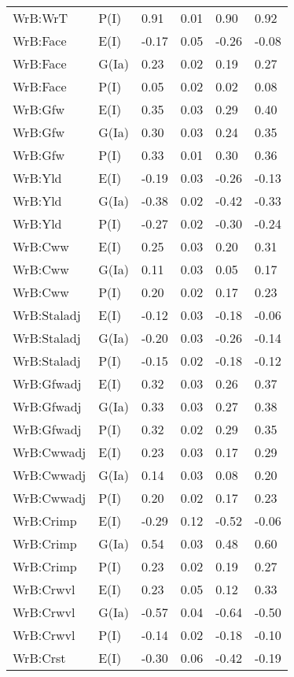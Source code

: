 \begin{center}
\begin{longtable}{|p{1.1in}|p{0.7in}|p{0.7in}|p{0.6in}|p{0.6in}|p{0.6in}|}
  WrB:WrT & P(I) & 0.91 & 0.01 & 0.90 & 0.92 \\ 
  WrB:Face & E(I) & -0.17 & 0.05 & -0.26 & -0.08 \\ 
  WrB:Face & G(Ia) & 0.23 & 0.02 & 0.19 & 0.27 \\ 
  WrB:Face & P(I) & 0.05 & 0.02 & 0.02 & 0.08 \\ 
  WrB:Gfw & E(I) & 0.35 & 0.03 & 0.29 & 0.40 \\ 
  WrB:Gfw & G(Ia) & 0.30 & 0.03 & 0.24 & 0.35 \\ 
  WrB:Gfw & P(I) & 0.33 & 0.01 & 0.30 & 0.36 \\ 
  WrB:Yld & E(I) & -0.19 & 0.03 & -0.26 & -0.13 \\ 
  WrB:Yld & G(Ia) & -0.38 & 0.02 & -0.42 & -0.33 \\ 
  WrB:Yld & P(I) & -0.27 & 0.02 & -0.30 & -0.24 \\ 
  WrB:Cww & E(I) & 0.25 & 0.03 & 0.20 & 0.31 \\ 
  WrB:Cww & G(Ia) & 0.11 & 0.03 & 0.05 & 0.17 \\ 
  WrB:Cww & P(I) & 0.20 & 0.02 & 0.17 & 0.23 \\ 
  WrB:Staladj & E(I) & -0.12 & 0.03 & -0.18 & -0.06 \\ 
  WrB:Staladj & G(Ia) & -0.20 & 0.03 & -0.26 & -0.14 \\ 
  WrB:Staladj & P(I) & -0.15 & 0.02 & -0.18 & -0.12 \\ 
  WrB:Gfwadj & E(I) & 0.32 & 0.03 & 0.26 & 0.37 \\ 
  WrB:Gfwadj & G(Ia) & 0.33 & 0.03 & 0.27 & 0.38 \\ 
  WrB:Gfwadj & P(I) & 0.32 & 0.02 & 0.29 & 0.35 \\ 
  WrB:Cwwadj & E(I) & 0.23 & 0.03 & 0.17 & 0.29 \\ 
  WrB:Cwwadj & G(Ia) & 0.14 & 0.03 & 0.08 & 0.20 \\ 
  WrB:Cwwadj & P(I) & 0.20 & 0.02 & 0.17 & 0.23 \\ 
  WrB:Crimp & E(I) & -0.29 & 0.12 & -0.52 & -0.06 \\ 
  WrB:Crimp & G(Ia) & 0.54 & 0.03 & 0.48 & 0.60 \\ 
  WrB:Crimp & P(I) & 0.23 & 0.02 & 0.19 & 0.27 \\ 
  WrB:Crwvl & E(I) & 0.23 & 0.05 & 0.12 & 0.33 \\ 
  WrB:Crwvl & G(Ia) & -0.57 & 0.04 & -0.64 & -0.50 \\ 
  WrB:Crwvl & P(I) & -0.14 & 0.02 & -0.18 & -0.10 \\ 
  WrB:Crst & E(I) & -0.30 & 0.06 & -0.42 & -0.19 \\ 

\end{longtable}
\end{center}
